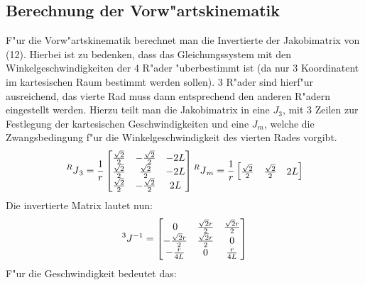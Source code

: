 \documentclass[11pt]{article}
\begin{document}
    \subsection{Berechnung der Vorw"artskinematik}\label{subsec:vor}
    F"ur die Vorw"artskinematik berechnet man die Invertierte der Jakobimatrix von (12).
    Hierbei ist zu bedenken, dass das Gleichungssystem mit den Winkelgeschwindigkeiten der 4 R"ader "uberbestimmt ist (da nur 3 Koordinatent im kartesischen Raum bestimmt werden sollen).
    3 R"ader sind hierf"ur ausreichend, das vierte Rad muss dann entsprechend den anderen R"adern eingestellt werden.
    Hierzu teilt man die Jakobimatrix in eine $J_{3}$, mit 3 Zeilen zur Festlegung der kartesischen Geschwindigkeiten und eine $J_{m}$, welche die Zwangsbedingung f"ur die Winkelgeschwindigkeit des vierten Rades vorgibt.
    \begin{equation}
        \prescript{R}{}{J}_{3} = \frac{1}{r}
        \begin{bmatrix}
            \frac{\sqrt{2}}{2} & -\frac{\sqrt{2}}{2} & -2L \\
            \frac{\sqrt{2}}{2} & \frac{\sqrt{2}}{2} & -2L \\
            \frac{\sqrt{2}}{2} & -\frac{\sqrt{2}}{2} & 2L \\
        \end{bmatrix}\label{eq:j3}
        \prescript{R}{}{J}_{m} = \frac{1}{r}
        \begin{bmatrix}
            \frac{\sqrt{2}}{2} & \frac{\sqrt{2}}{2} & 2L \\
        \end{bmatrix}
    \end{equation}
    Die invertierte Matrix lautet nun:
    \begin{equation}
        \prescript{3}{}{J}^{-1} =
        \begin{bmatrix}
            0 & \frac{\sqrt{2}r}{2} & \frac{\sqrt{2}r}{2} \\
            -\frac{\sqrt{2}r}{2} & \frac{\sqrt{2}r}{2} & 0 \\
            -\frac{r}{4L} & 0 & \frac{r}{4L} \\
        \end{bmatrix}\label{eq:invertedj3}
    \end{equation}
    F"ur die Geschwindigkeit bedeutet das:
\end{document}
